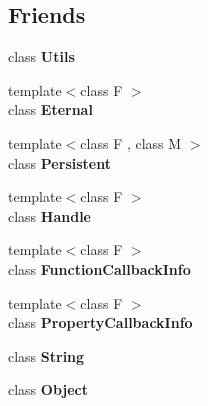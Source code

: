 \subsection*{Friends}
\begin{DoxyCompactItemize}
\item 
\hypertarget{classv8_1_1_local_abc0f7da619e9e72510dc07ed7b5ff6d8}{}class {\bfseries Utils}\label{classv8_1_1_local_abc0f7da619e9e72510dc07ed7b5ff6d8}

\item 
\hypertarget{classv8_1_1_local_adf5d8780aceb9310fb1246aae7ec348e}{}{\footnotesize template$<$class F $>$ }\\class {\bfseries Eternal}\label{classv8_1_1_local_adf5d8780aceb9310fb1246aae7ec348e}

\item 
\hypertarget{classv8_1_1_local_ad845ec8872174be0a9ca9a3dd1898d30}{}{\footnotesize template$<$class F , class M $>$ }\\class {\bfseries Persistent}\label{classv8_1_1_local_ad845ec8872174be0a9ca9a3dd1898d30}

\item 
\hypertarget{classv8_1_1_local_a67ca1a2d91273eaf85fb3d23ba8ce984}{}{\footnotesize template$<$class F $>$ }\\class {\bfseries Handle}\label{classv8_1_1_local_a67ca1a2d91273eaf85fb3d23ba8ce984}

\item 
\hypertarget{classv8_1_1_local_a76786e6fa2d0eac5e2d4f647659d0d23}{}{\footnotesize template$<$class F $>$ }\\class {\bfseries Function\+Callback\+Info}\label{classv8_1_1_local_a76786e6fa2d0eac5e2d4f647659d0d23}

\item 
\hypertarget{classv8_1_1_local_a5018adab21fade2b42f4f60e45fa1083}{}{\footnotesize template$<$class F $>$ }\\class {\bfseries Property\+Callback\+Info}\label{classv8_1_1_local_a5018adab21fade2b42f4f60e45fa1083}

\item 
\hypertarget{classv8_1_1_local_a7fb804f7dc96dd9f705c84095f37f1ca}{}class {\bfseries String}\label{classv8_1_1_local_a7fb804f7dc96dd9f705c84095f37f1ca}

\item 
\hypertarget{classv8_1_1_local_a0720b5f434e636e22a3ed34f847eec57}{}class {\bfseries Object}\label{classv8_1_1_local_a0720b5f434e636e22a3ed34f847eec57}


\end{DoxyCompactItemize}
